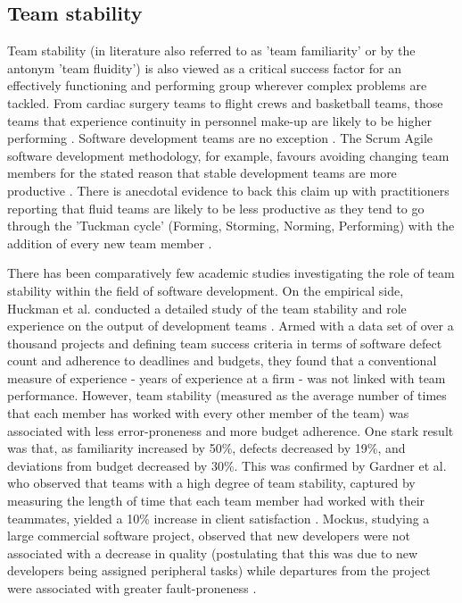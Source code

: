 \subsection{Team stability}
Team stability (in literature also referred to as  'team familiarity' or by the antonym 'team fluidity') is also viewed as a critical success factor for an effectively functioning and performing group wherever complex problems are tackled. From cardiac surgery teams to flight crews and basketball teams, those teams that experience continuity in personnel make-up are likely to be higher performing \citep{carthey2001human, akgun2002antecedents, yeh2005influences, wiegmann2010improving, huckman2013hidden, joshi2018should}. Software development teams are no exception \citep{bao2017will}. The Scrum Agile software development methodology, for example, favours avoiding changing team members for the stated reason that stable development teams are more productive \citep{deemer2010scrum}. There is anecdotal evidence to back this claim up with practitioners reporting that fluid teams are likely to be less productive as they tend to go through the 'Tuckman cycle' (Forming, Storming, Norming, Performing) with the addition of every new team member \citep{tuckman1965developmental, linders2011establishing}.

There has been comparatively few academic studies investigating the role of team stability within the field of software development. On the empirical side, Huckman et al. conducted a detailed study of the team stability and role experience on the output of development teams \citep{huckman2009team}. Armed with a data set of over a thousand projects and defining team success criteria in terms of software defect count and adherence to deadlines and budgets,  they found that a conventional measure of experience - years of experience at a firm - was not linked with team performance. However, team stability (measured as the average number of times that each member has worked with every other member of the team) was associated with less error-proneness and more budget adherence. One stark result was that, as familiarity increased by 50\%, defects decreased by 19\%, and deviations from budget decreased by 30\%. This was confirmed by Gardner et al. who observed that teams with a high degree of team stability, captured by measuring the length of time that each team member had worked with their teammates, yielded a 10\% increase in client satisfaction \citep{gardner2012dynamically}. Mockus, studying a large commercial software project, observed that new developers were not associated with a decrease in quality (postulating that this was due to new developers being assigned peripheral tasks) while departures from the project were associated with greater fault-proneness \citep{mockus2010organizational}.
 
